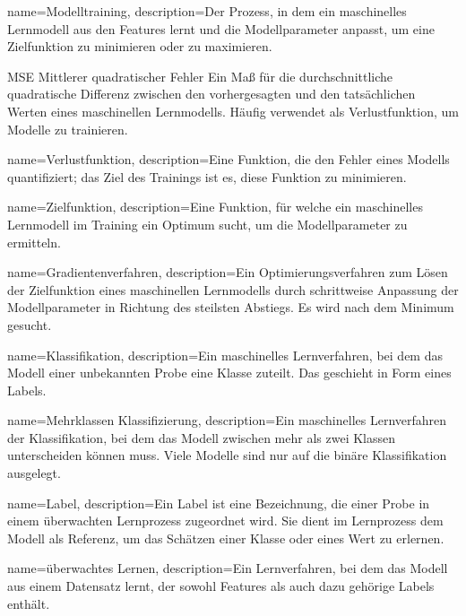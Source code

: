 {
        name=Modelltraining,
        description={Der Prozess, in dem ein maschinelles Lernmodell aus den Features lernt und die Modellparameter anpasst, um eine Zielfunktion zu minimieren oder zu maximieren.}
}

\newglossaryentrywithacronym
{MSE}
{Mittlerer quadratischer Fehler}
{Ein Maß für die durchschnittliche quadratische Differenz zwischen den vorhergesagten und den tatsächlichen Werten eines maschinellen Lernmodells. Häufig verwendet als Verlustfunktion, um Modelle zu trainieren.}

{
        name=Verlustfunktion,
        description={Eine Funktion, die den Fehler eines Modells quantifiziert; das Ziel des Trainings ist es, diese Funktion zu minimieren.}
}

{
        name=Zielfunktion,
        description={Eine Funktion, für welche ein maschinelles Lernmodell im Training ein Optimum sucht, um die Modellparameter zu ermitteln.}
}

{
        name=Gradientenverfahren,
        description={Ein Optimierungsverfahren zum Lösen der Zielfunktion eines maschinellen Lernmodells durch schrittweise Anpassung der Modellparameter in Richtung des steilsten Abstiegs. Es wird nach dem Minimum gesucht.}
}

{
        name=Klassifikation,
        description={Ein maschinelles Lernverfahren, bei dem das Modell einer unbekannten Probe eine Klasse zuteilt. Das geschieht in Form eines Labels.}
}


{
        name=Mehrklassen Klassifizierung,
        description={Ein maschinelles Lernverfahren der Klassifikation, bei dem das Modell zwischen mehr als zwei Klassen unterscheiden können muss. Viele Modelle sind nur auf die binäre Klassifikation ausgelegt.}
}

{
        name=Label,
        description={Ein Label ist eine Bezeichnung, die einer Probe in einem überwachten Lernprozess zugeordnet wird. Sie dient im Lernprozess dem Modell als Referenz, um das Schätzen einer Klasse oder eines Wert zu erlernen.}
}

{
        name=überwachtes Lernen,
        description={Ein Lernverfahren, bei dem das Modell aus einem Datensatz lernt, der sowohl Features als auch dazu gehörige Labels enthält.}
}

